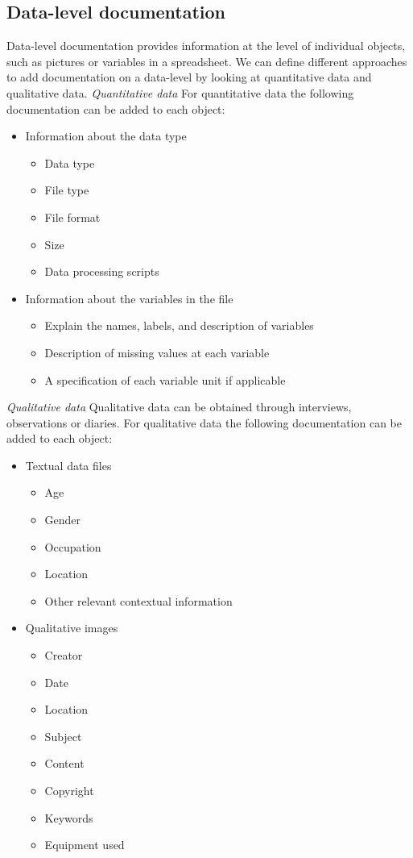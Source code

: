 \subsection{Data-level documentation}
\whiteline
Data-level documentation provides information at the level of individual objects, such as pictures or variables in a spreadsheet. We can define different approaches to add documentation on a data-level by looking at quantitative data and qualitative data. \cite{CESSDA}
\whiteline
\textit{Quantitative data}
For quantitative data the following documentation can be added to each object:
\begin{itemize}
\item Information about the data type
	\begin{itemize}
		\item Data type
		\item File type
		\item File format
		\item Size
		\item Data processing scripts
	\end{itemize}
\item Information about the variables in the file
	\begin{itemize}
		\item Explain the names, labels, and description of variables
		\item Description of missing values at each variable
		\item A specification of each variable unit if applicable
	\end{itemize}
\end{itemize}
\whiteline
\textit{Qualitative data}
\whiteline
Qualitative data can be obtained through interviews, observations or diaries. For qualitative data the following documentation can be added to each object:
\begin{itemize}
	\item Textual data files
		\begin{itemize}
			\item Age
			\item Gender
			\item Occupation
			\item Location
			\item Other relevant contextual information
		\end{itemize}
	\item Qualitative images
		\begin{itemize}
			\item Creator
			\item Date
			\item Location
			\item Subject
			\item Content
			\item Copyright
			\item Keywords
			\item Equipment used
		\end{itemize}
\end{itemize}

